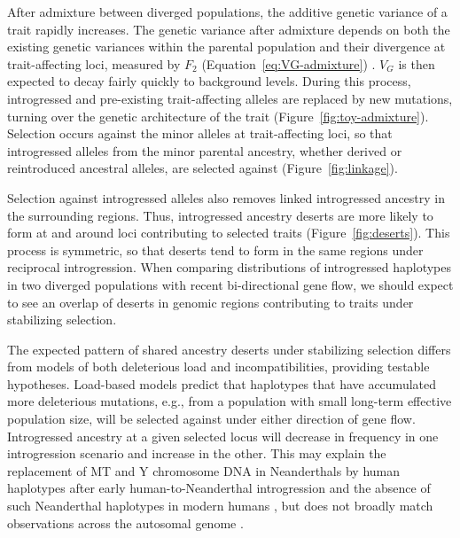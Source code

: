 \documentclass{article}
\begin{document}
After admixture between diverged populations, the additive genetic variance of
a trait rapidly increases. The genetic variance after admixture depends on both
the existing genetic variances within the parental population and their
divergence at trait-affecting loci, measured by $F_2$
(Equation~\ref{eq:VG-admixture}) \citep[see also,][]{veller2024stabilizing}.
$V_G$ is then expected to decay fairly quickly to background levels. During
this process, introgressed and pre-existing trait-affecting alleles are
replaced by new mutations, turning over the genetic architecture of the trait
(Figure~\ref{fig:toy-admixture}).  Selection occurs against the minor alleles
at trait-affecting loci, so that introgressed alleles from the minor parental
ancestry, whether derived or reintroduced ancestral alleles, are selected
against (Figure~\ref{fig:linkage}).

Selection against introgressed alleles also removes linked introgressed
ancestry in the surrounding regions. Thus, introgressed ancestry deserts are
more likely to form at and around loci contributing to selected traits
(Figure~\ref{fig:deserts}). This process is symmetric, so that deserts tend to
form in the same regions under reciprocal introgression. When comparing
distributions of introgressed haplotypes in two diverged populations with
recent bi-directional gene flow, we should expect to see an overlap of deserts
in genomic regions contributing to traits under stabilizing selection.

The expected pattern of shared ancestry deserts under stabilizing selection
differs from models of both deleterious load and incompatibilities, providing
testable hypotheses. Load-based models predict that haplotypes that have
accumulated more deleterious mutations, e.g., from a population with small
long-term effective population size, will be selected against under either
direction of gene flow. Introgressed ancestry at a given selected locus will
decrease in frequency in one introgression scenario and increase in the other.
This may explain the replacement of MT and Y chromosome DNA in Neanderthals by
human haplotypes after early human-to-Neanderthal introgression and the absence
of such Neanderthal haplotypes in modern humans \citep{posth2017deeply,
petr2020evolutionary}, but does not broadly match observations across the
autosomal genome \citep{harris2023diverse}.
\end{document}
